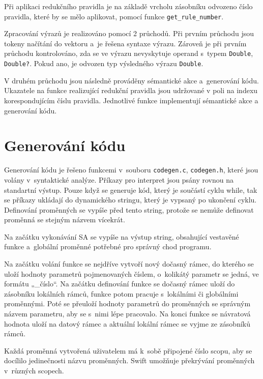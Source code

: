 \documentclass[11pt]{article}
\begin{document}
Při aplikaci redukčního pravidla je na základě vrcholu zásobníku odvozeno číslo pravidla, které by se mělo aplikovat, pomocí funkce \texttt{get\_rule\_number}.


Zpracování výrazů je realizováno pomocí 2 průchodů. Při prvním průchodu jsou tokeny načítání do vektoru a~je řešena syntaxe výrazu.
Zároveň je při prvním průchodu kontrolováno, zda se ve výrazu nevyskytuje operand s~typem \texttt{Double}, \texttt{Double?}. Pokud
ano, je odvozen typ výsledného výrazu \texttt{Double}.

V druhém průchodu jsou následně prováděny sémantické akce a~generování kódu.
Ukazatele na funkce realizující redukční pravidla jsou udržované v poli na indexu korespondujícím
číslu pravidla. Jednotlivé funkce implementují sémantické akce a generování kódu.












\section{Generování kódu}
Generování kódu je řešeno funkcemi v~souboru \texttt{codegen.c},  \texttt{codegen.h},
které jsou volány v~syntaktické analýze.
Příkazy pro interpret jsou psány rovnou na standartní výstup.
Pouze když se generuje kód, který je součástí cyklu while, tak se příkazy ukládají
do dynamického stringu, který je vypsaný po ukončení cyklu.
Definování proměnných se vypíše před tento string, protože se nemůže definovat proměnná se stejným názvem vícekrát.

Na začátku vykonávání SA se vypíše na výstup string, obsahující vestavěné funkce a~globální proměnné potřebné pro správný chod programu.

Na začátku volání funkce se nejdříve vytvoří nový dočasný rámec, do kterého se uloží hodnoty parametrů pojmenovaných číslem,
o~kolikátý parametr se jedná, ve formátu „\_číslo“. Na začátku definování funkce se dočasný rámec uloží do zásobníku
lokálních rámců, funkce potom pracuje s~lokálními či globálními proměnnými.
Poté se přeuloží hodnoty parametrů do proměnných se správným názvem parametru, aby se s~nimi lépe pracovalo.
Na konci funkce se návratová hodnota uloží na datový rámec a aktuální lokální rámec se vyjme ze zásobníků rámců.

Každá proměnná vytvořená uživatelem má k~sobě připojené číslo scopu, aby se docílilo jedinečnosti názvu proměnných.
Swift umožňuje překrývání proměnných v~různých scopech.
\end{document}
